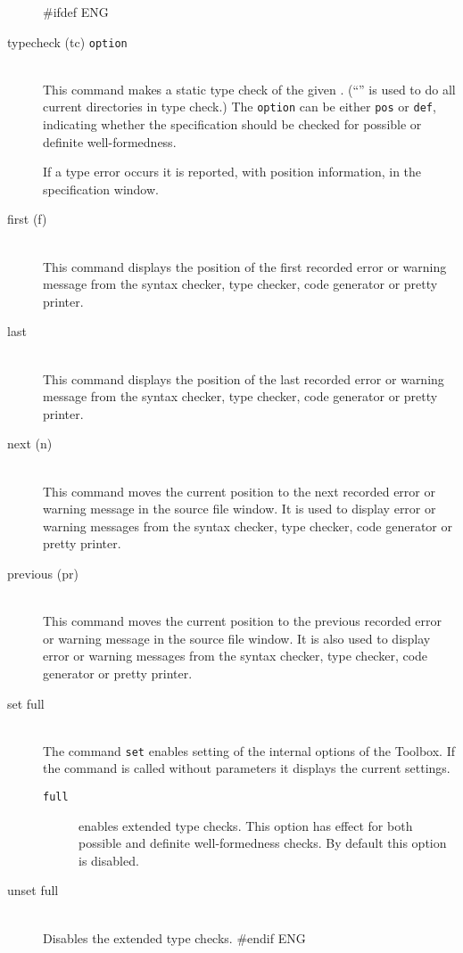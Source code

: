 \documentclass[\pformat,12pt]{article}
\newcommand{\Toolbox}{Toolbox}
\newcommand{\Toolbox}{Toolbox}
\begin{document}
\begin{description}  
#ifdef ENG
\item[typecheck (tc) \ifthenelse{\boolean{VDMsl}}{{[}{\tt
      module}{]}}{{\tt class}} {\tt option}]\mbox{}\\ 
  This command makes a static type check of the given
  .
  (``{\tt *}'' is used to do  all current directories in type check.)
  The {\tt option} can be either {\tt pos} or {\tt def}, indicating whether the
  specification should be checked for possible or definite
  well-formedness.

  If a type error occurs it is reported, with position
  information, in the specification window.

\item[first (f)] \mbox{}\\
  This command displays the position of the first recorded error or
  warning message from the syntax checker, type checker, code
  generator or pretty printer.

\item[last] \mbox{}\\
  This command displays the position of the last recorded error or
  warning message from the syntax checker, type checker, code
  generator or pretty printer.

\item[next (n) \index{next command}]\mbox{}\\
  This command moves the current position to the next recorded error
  or warning message in the source file window.  It is used to
  display error or warning messages from the syntax checker, type
  checker, code generator or pretty printer.

\item[previous (pr)] \mbox{}\\
  This command moves the current position to the previous recorded
  error or warning message in the source file window. It is also used to
  display error or warning messages from the syntax checker, type
  checker, code generator or pretty printer.

\item[set full]\mbox{}\\
  The command {\tt set} enables setting of the internal options of the
  \Toolbox.  If the command is called without parameters it displays
  the current settings.
  \begin{description}
    \item[{\tt full}] enables extended type checks. This option has
      effect for both possible and definite well-formedness checks. By
      default this option is disabled.
  \end{description}
\item[unset full]\mbox{}\\
  Disables the extended type checks.
#endif ENG


\end{description}
\end{document}
